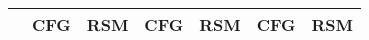 \begin{frame}
\begin{figure}[H]
\begin{table}[]
{\begin{tabular}{|l|rrrrrr|}
\multicolumn{1}{|c|}{} &
  \multicolumn{1}{c|}{CFG} &
  \multicolumn{1}{c|}{RSM} &
  \multicolumn{1}{c|}{CFG} &
  \multicolumn{1}{c|}{RSM} &
  \multicolumn{1}{c|}{CFG} &
  \multicolumn{1}{c|}{RSM} \\ \hline

\end{tabular}}
\end{table}
\end{figure}
\end{frame}

